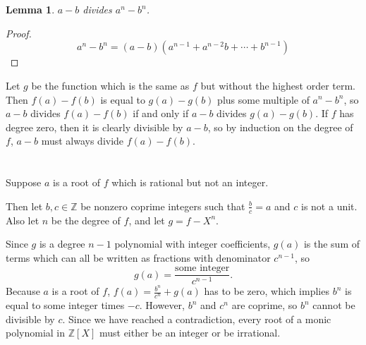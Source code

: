 \documentclass[12pt]{article}
\newtheorem{lem}[thm]{Lemma}
\begin{document}
\section{}
\noindent{}\bigskip\par
\begin{lem}\label{divides}
    $a-b$ divides $a^n-b^n$.
\end{lem}
\begin{proof}
    \[ a^n-b^n = (a-b) \left( a^{n-1}+ a^{n-2}b + \cdots + b^{n-1} \right) \]
\end{proof}
Let $g$ be the function which is the same as $f$ but without the highest order term. Then $f(a)-f(b)$ is equal to $g(a)-g(b)$ plus some multiple of $a^n-b^n$, so $a-b$ divides $f(a)-f(b)$ if and only if $a-b$ divides $g(a)-g(b)$. If $f$ has degree zero, then it is clearly divisible by $a-b$, so by induction on the degree of $f$, $a-b$ must always divide $f(a)-f(b)$.

\section{}
\noindent{}\bigskip\par

\section{}
\noindent{}\bigskip\par
Suppose $a$ is a root of $f$ which is rational but not an integer.
\par
Then let $b,c \in \mathbb{Z}$ be nonzero coprime integers such that $\frac{b}{c}=a$ and $c$ is not a unit. Also let $n$ be the degree of $f$, and let $g=f-X^n$.
\par
Since $g$ is a degree $n-1$ polynomial with integer coefficients, $g(a)$ is the sum of terms which can all be written as fractions with denominator $c^{n-1}$, so
\[ g(a) = \frac{\text{some integer}}{c^{n-1}}. \]
Because $a$ is a root of $f$, $f(a)=\frac{b^n}{c^n}+g(a)$ has to be zero, which implies $b^n$ is equal to some integer times $-c$. However, $b^n$ and $c^n$ are coprime, so $b^n$ cannot be divisible by $c$. Since we have reached a contradiction, every root of a monic polynomial in $\mathbb{Z}[X]$ must either be an integer or be irrational.
\end{document}
